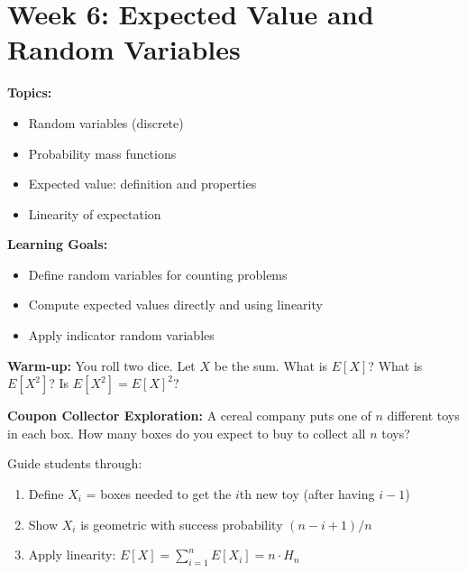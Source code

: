 \documentclass[11pt]{article}
\begin{document}
\newpage
\section{Week 6: Expected Value and Random Variables}

\begin{classabox}
\textbf{Topics:}
\begin{itemize}
    \item Random variables (discrete)
    \item Probability mass functions
    \item Expected value: definition and properties
    \item Linearity of expectation
\end{itemize}

\textbf{Learning Goals:}
\begin{itemize}
    \item Define random variables for counting problems
    \item Compute expected values directly and using linearity
    \item Apply indicator random variables
\end{itemize}

\textbf{Warm-up:} You roll two dice. Let $X$ be the sum. What is $E[X]$? What is $E[X^2]$? Is $E[X^2] = E[X]^2$?
\end{classabox}

\begin{activitybox}
\textbf{Coupon Collector Exploration:} A cereal company puts one of $n$ different toys in each box. How many boxes do you expect to buy to collect all $n$ toys?

Guide students through:
\begin{enumerate}
    \item Define $X_i$ = boxes needed to get the $i$th new toy (after having $i-1$)
    \item Show $X_i$ is geometric with success probability $(n-i+1)/n$
    \item Apply linearity: $E[X] = \sum_{i=1}^{n} E[X_i] = n \cdot H_n$
\end{enumerate}
\end{activitybox}
\end{document}
